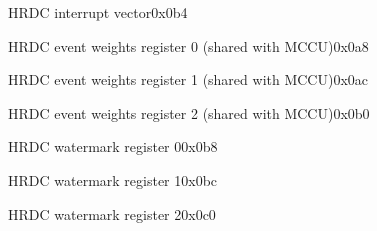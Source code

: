 \begin{register}{H}{RDC interrupt vector}{0x0b4}
	\label{RDC_intrv}
	\regnewline
\end{register}
\begin{register}{H}{RDC event weights register 0 (shared with MCCU)}{0x0a8}
	\label{RDC_weight0}
	\regnewline
\end{register}
\begin{register}{H}{RDC event weights register 1 (shared with MCCU)}{0x0ac}
	\label{RDC_weight1}
	\regnewline
\end{register}
\begin{register}{H}{RDC event weights register 2 (shared with MCCU)}{0x0b0}
	\label{MCCU_weight1_2}
	\regnewline
\end{register}


\begin{register}{H}{RDC watermark register 0}{0x0b8}
	\label{RDC_water0}
	\regnewline
\end{register}


\begin{register}{H}{RDC watermark register 1}{0x0bc}
	\label{RDC_water1}
	\regnewline
\end{register}

\begin{register}{H}{RDC watermark register 2}{0x0c0}
	\label{RDC_water2}
	\regnewline
\end{register}


